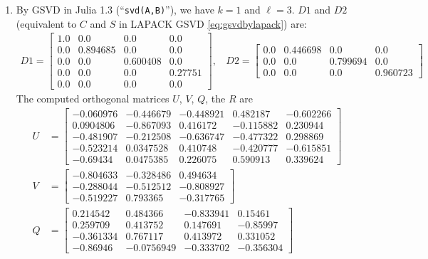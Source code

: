 \begin{example}
{\begin{enumerate}[(1).]
\item 
By GSVD in Julia 1.3 (``{\tt svd(A,B)}''), we have $k = 1$ and $\ell = 3$. 
$D1$ and $D2$ (equivalent to $C$ and $S$ 
in LAPACK GSVD \eqref{eq:gsvdbylapack}) are:
\begin{align*}
D1 = \begin{bmatrix}
      1.0 & 0.0 & 0.0 & 0.0 \\
      0.0 & 0.894685 & 0.0 & 0.0 \\
      0.0 & 0.0 & 0.600408 & 0.0 \\   
      0.0 & 0.0 & 0.0 & 0.27751 \\
      0.0 & 0.0 & 0.0 & 0.0
    \end{bmatrix} , \ \ \ \
     D2 = \begin{bmatrix}
      0.0 & 0.446698 & 0.0 & 0.0 \\     
      0.0 & 0.0 & 0.799694 & 0.0 \\  
      0.0 & 0.0 & 0.0 & 0.960723
    \end{bmatrix}
\end{align*}
The computed orthogonal matrices $U$, $V$, $Q$, the $R$ are
\begin{align*}
    U &= \begin{bmatrix}
      -0.060976 &  -0.446679  & -0.448921 &  0.482187 & -0.602266 \\
       0.0904806 & -0.867093  &  0.416172 & -0.115882 &  0.230944 \\
      -0.481907 &  -0.212508  & -0.636747 & -0.477322 &  0.298869 \\
      -0.523214  &  0.0347528 &  0.410748 & -0.420777 & -0.615851 \\
      -0.69434  &   0.0475385 &  0.226075 &  0.590913 &  0.339624
    \end{bmatrix} \\ 
    V &= \begin{bmatrix}
      -0.804633 & -0.328486 & 0.494634 \\
      -0.288044 & -0.512512 & -0.808927 \\
      -0.519227 &  0.793365 & -0.317765
    \end{bmatrix} \\ 
    Q &= \begin{bmatrix}
       0.214542 & 0.484366 & -0.833941 &  0.15461 \\ 
       0.259709 &  0.413752 & 0.147691 & -0.85997 \\
      -0.361334 &  0.767117 &   0.413972 & 0.331052 \\
      -0.86946 & -0.0756949 & -0.333702 & -0.356304

\end{bmatrix}
\end{align*}
\end{enumerate}}
\end{example}
